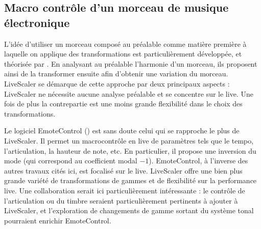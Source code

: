 \subsection{Macro contrôle d'un morceau de musique électronique}
L'idée d'utiliser un morceau composé au préalable comme matière première à laquelle on applique des transformations est particulièrement développée, et théorisée par \textcite{bigo2016viewpoint}. En analysant au préalable l'harmonie d'un morceau, ils proposent ainsi de la transformer ensuite afin d'obtenir une variation du morceau. LiveScaler se démarque de cette approche par deux principaux aspects : LiveScaler ne nécessite aucune analyse préalable et se concentre sur le live. Une fois de plus la contrepartie est une moins grande flexibilité dans le choix des transformations.

Le logiciel EmoteControl (\cite{micallef2021emotecontrol}) est sans doute celui qui se rapproche le plus de LiveScaler. Il permet un macrocontrôle en live de paramètres tels que le tempo, l'articulation, la hauteur de note, etc. En particulier, il propose une inversion du mode (qui correspond au coefficient modal $-1$). EmoteControl, à l'inverse des autres travaux cités ici, est focalisé sur le live. LiveScaler offre une bien plus grande variété de transformations de gammes et de flexibilité sur la performance live. Une collaboration serait ici particulièrement intéressante : le contrôle de l'articulation ou du timbre seraient particulièrement pertinents à ajouter à LiveScaler, et l'exploration de changements de gamme sortant du système tonal pourraient enrichir EmoteControl.






